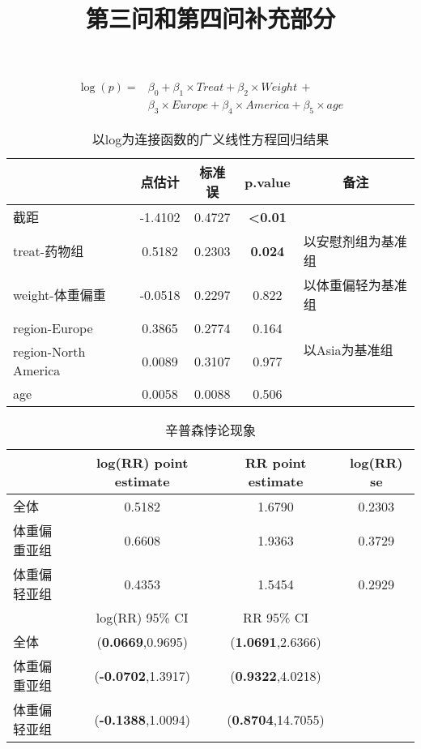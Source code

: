 \documentclass{article}
\title{第三问和第四问补充部分}
\author{}
\date{}
\begin{document}
	\maketitle



\begin{align*}
    \log(p) = &\beta_0 + \beta_1 \times Treat + \beta_2 \times Weight \,+ \\
	&\beta_3 \times Europe + \beta_4 \times America + \beta_5 \times age
\end{align*}






\begin{table}[H]
	\centering
	\caption{以log为连接函数的广义线性方程回归结果}
\begin{tabular}{lcccl}
	\hline
                     & 点估计     & 标准误    & p.value         & \multicolumn{1}{c}{备注}    \\ \hline
截距                   & -1.4102 & 0.4727 & \textbf{<0.01} &                           \\ 
treat-药物组            & 0.5182  & 0.2303 & \textbf{0.024}          & 以安慰剂组为基准组                 \\
weight-体重偏重          & -0.0518 & 0.2297 & 0.822          & 以体重偏轻为基准组                 \\
region-Europe        & 0.3865  & 0.2774 & 0.164          & \multirow{2}{*}{以Asia为基准组} \\
region-North America & 0.0089  & 0.3107 & 0.977          &                           \\
age                  & 0.0058  & 0.0088 & 0.506          &                          \\ \hline
\end{tabular}
\end{table}



\begin{table}[H]
	\centering
	\caption{辛普森悖论现象}
	\begin{tabular}{lccc}
		\hline
		& log(RR) point estimate & RR point estimate & log(RR) se \\ \hline
 全体     & 0.5182                 & 1.6790            & 0.2303     \\
 体重偏重亚组 & 0.6608                 & 1.9363            & 0.3729     \\
 体重偏轻亚组 & 0.4353                 & 1.5454            & 0.2929     \\ \hline
		& log(RR) 95\% CI        & RR 95\% CI        &            \\ \hline
 全体     & (\textbf{0.0669},0.9695)        & (\textbf{1.0691},2.6366)   &            \\
 体重偏重亚组 & (\textbf{-0.0702},1.3917)       & (\textbf{0.9322},4.0218)   &            \\
 体重偏轻亚组 & (\textbf{-0.1388},1.0094)       & (\textbf{0.8704},14.7055)  &           \\ \hline
 \end{tabular}
	\end{table}
\end{document}
